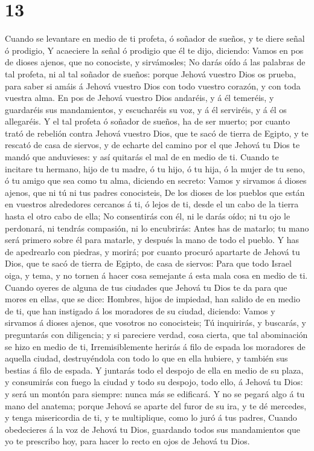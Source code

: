 \hypertarget{section-12}{%
\section{13}\label{section-12}}

 Cuando se levantare en medio de ti profeta, ó soñador de
sueños, y te diere señal ó prodigio,  Y acaeciere la señal
ó prodigio que él te dijo, diciendo: Vamos en pos de dioses ajenos, que
no conociste, y sirvámosles;  No darás oído á las palabras
de tal profeta, ni al tal soñador de sueños: porque Jehová vuestro Dios
os prueba, para saber si amáis á Jehová vuestro Dios con todo vuestro
corazón, y con toda vuestra alma.  En pos de Jehová
vuestro Dios andaréis, y á él temeréis, y guardaréis sus mandamientos, y
escucharéis su voz, y á él serviréis, y á él os allegaréis.
 Y el tal profeta ó soñador de sueños, ha de ser muerto;
por cuanto trató de rebelión contra Jehová vuestro Dios, que te sacó de
tierra de Egipto, y te rescató de casa de siervos, y de echarte del
camino por el que Jehová tu Dios te mandó que anduvieses: y así quitarás
el mal de en medio de ti.  Cuando te incitare tu hermano,
hijo de tu madre, ó tu hijo, ó tu hija, ó la mujer de tu seno, ó tu
amigo que sea como tu alma, diciendo en secreto: Vamos y sirvamos á
dioses ajenos, que ni tú ni tus padres conocisteis,  De
los dioses de los pueblos que están en vuestros alrededores cercanos á
ti, ó lejos de ti, desde el un cabo de la tierra hasta el otro cabo de
ella;  No consentirás con él, ni le darás oído; ni tu ojo
le perdonará, ni tendrás compasión, ni lo encubrirás: 
Antes has de matarlo; tu mano será primero sobre él para matarle, y
después la mano de todo el pueblo.  Y has de apedrearlo
con piedras, y morirá; por cuanto procuró apartarte de Jehová tu Dios,
que te sacó de tierra de Egipto, de casa de siervos: 
Para que todo Israel oiga, y tema, y no tornen á hacer cosa semejante á
esta mala cosa en medio de ti.  Cuando oyeres de alguna
de tus ciudades que Jehová tu Dios te da para que mores en ellas, que se
dice:  Hombres, hijos de impiedad, han salido de en medio
de ti, que han instigado á los moradores de su ciudad, diciendo: Vamos y
sirvamos á dioses ajenos, que vosotros no conocisteis; 
Tú inquirirás, y buscarás, y preguntarás con diligencia; y si pareciere
verdad, cosa cierta, que tal abominación se hizo en medio de ti,
 Irremisiblemente herirás á filo de espada los moradores
de aquella ciudad, destruyéndola con todo lo que en ella hubiere, y
también sus bestias á filo de espada.  Y juntarás todo el
despojo de ella en medio de su plaza, y consumirás con fuego la ciudad y
todo su despojo, todo ello, á Jehová tu Dios: y será un montón para
siempre: nunca más se edificará.  Y no se pegará algo á
tu mano del anatema; porque Jehová se aparte del furor de su ira, y te
dé mercedes, y tenga misericordia de ti, y te multiplique, como lo juró
á tus padres,  Cuando obedecieres á la voz de Jehová tu
Dios, guardando todos sus mandamientos que yo te prescribo hoy, para
hacer lo recto en ojos de Jehová tu Dios.

